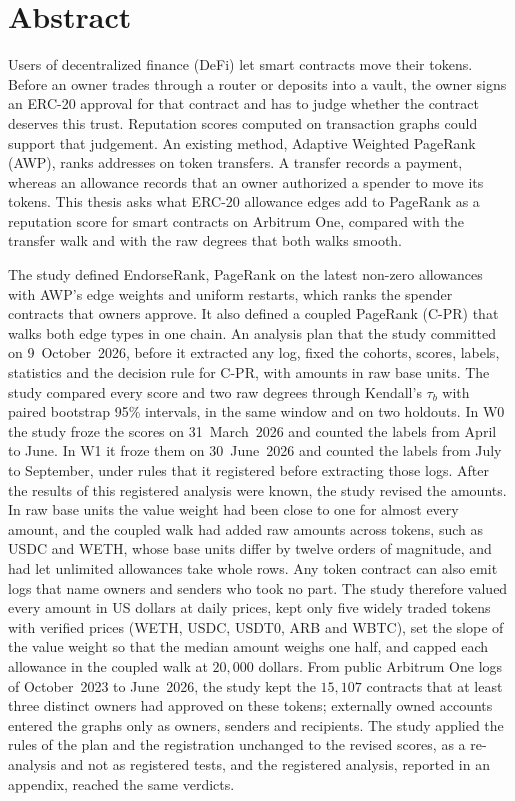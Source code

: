 
\chapter*{Abstract}

\label{ch:abstract}

Users of decentralized finance (DeFi) let smart contracts move their tokens. Before an owner trades through a router or deposits into a vault, the owner signs an ERC-20 approval for that contract and has to judge whether the contract deserves this trust. Reputation scores computed on transaction graphs could support that judgement. An existing method, Adaptive Weighted PageRank (AWP), ranks addresses on token transfers. A transfer records a payment, whereas an allowance records that an owner authorized a spender to move its tokens. This thesis asks what ERC-20 allowance edges add to PageRank as a reputation score for smart contracts on Arbitrum One, compared with the transfer walk and with the raw degrees that both walks smooth.

The study defined EndorseRank, PageRank on the latest non-zero allowances with AWP's edge weights and uniform restarts, which ranks the spender contracts that owners approve. It also defined a coupled PageRank (C-PR) that walks both edge types in one chain. An analysis plan that the study committed on 9~October~2026, before it extracted any log, fixed the cohorts, scores, labels, statistics and the decision rule for C-PR, with amounts in raw base units. The study compared every score and two raw degrees through Kendall's $\tau_b$ with paired bootstrap 95\% intervals, in the same window and on two holdouts. In W0 the study froze the scores on 31~March~2026 and counted the labels from April to June. In W1 it froze them on 30~June~2026 and counted the labels from July to September, under rules that it registered before extracting those logs. After the results of this registered analysis were known, the study revised the amounts. In raw base units the value weight had been close to one for almost every amount, and the coupled walk had added raw amounts across tokens, such as USDC and WETH, whose base units differ by twelve orders of magnitude, and had let unlimited allowances take whole rows. Any token contract can also emit logs that name owners and senders who took no part. The study therefore valued every amount in US dollars at daily prices, kept only five widely traded tokens with verified prices (WETH, USDC, USDT0, ARB and WBTC), set the slope of the value weight so that the median amount weighs one half, and capped each allowance in the coupled walk at $20{,}000$ dollars. From public Arbitrum One logs of October~2023 to June~2026, the study kept the $15{,}107$ contracts that at least three distinct owners had approved on these tokens; externally owned accounts entered the graphs only as owners, senders and recipients. The study applied the rules of the plan and the registration unchanged to the revised scores, as a re-analysis and not as registered tests, and the registered analysis, reported in an appendix, reached the same verdicts.

